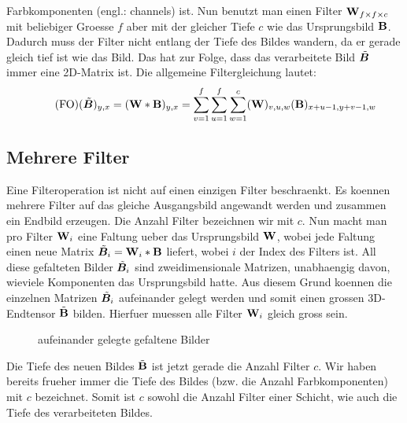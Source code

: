 Farbkomponenten (engl.: channels) ist.
Nun benutzt man einen Filter $\mathbf{W}_{f \times f \times c}$ mit beliebiger Groesse
$f$ aber mit der gleicher Tiefe $c$ wie das Ursprungsbild $\mathbf{B}$.
Dadurch muss der Filter nicht entlang der Tiefe des Bildes wandern, da er
gerade gleich tief ist wie das Bild. Das hat zur Folge, dass das verarbeitete
Bild $\tilde{\bm{B}}$ immer eine 2D-Matrix ist.
Die allgemeine Filtergleichung lautet:
\\
\begin{equation}\tag{FO}
  (\tilde{\bm{B}})_{y,x} = (\mathbf{W} * \mathbf{B})_{y,x} = \sum_{v=1}^{f} \sum_{u=1}^{f} \sum_{w=1}^c (\mathbf{W})_{v,u,w} (\mathbf{B})_{x+u-1,y+v-1,w}
\end{equation}

\para{}
\cite{Goodfellow-et-al-2016}
\cite{deeplearning.ai:cnn}
\cite{wiki:cnn}

\subsection{Mehrere Filter}
Eine Filteroperation ist nicht auf einen einzigen Filter beschraenkt. Es koennen
mehrere Filter auf das gleiche Ausgangsbild angewandt werden und zusammen ein
Endbild erzeugen.
\para{}
Die Anzahl Filter bezeichnen wir mit $c$.
Nun macht man pro Filter $\mathbf{W}_i$ eine Faltung ueber das Ursprungsbild $\mathbf{W}$, wobei
jede Faltung einen neue Matrix $\tilde{\bm{B}}_i = \mathbf{W}_i * \mathbf{B}$ liefert, wobei $i$ der Index des
Filters ist. All diese gefalteten Bilder $\tilde{\bm{B}}_i$ sind zweidimensionale Matrizen, unabhaengig davon, wieviele
Komponenten das Ursprungsbild hatte. Aus diesem Grund koennen die einzelnen
Matrizen $\tilde{\bm{B}}_i$ aufeinander gelegt werden und somit einen grossen 3D-Endtensor
$\tilde{\mathbf{B}}$ bilden.
Hierfuer muessen alle Filter $\mathbf{W}_i$ gleich gross sein.
\begin{figure}[h!]
  \caption{aufeinander gelegte gefaltene Bilder}

\end{figure}
Die Tiefe des neuen Bildes $\tilde{\mathbf{B}}$ ist jetzt gerade die Anzahl Filter $c$.
Wir haben bereits frueher immer die Tiefe des Bildes (bzw. die Anzahl
Farbkomponenten) mit $c$ bezeichnet. Somit ist $c$ sowohl die Anzahl Filter
einer Schicht, wie auch die Tiefe des verarbeiteten Bildes.

\para{}
\cite{Goodfellow-et-al-2016}
\cite{deeplearning.ai:cnn}

